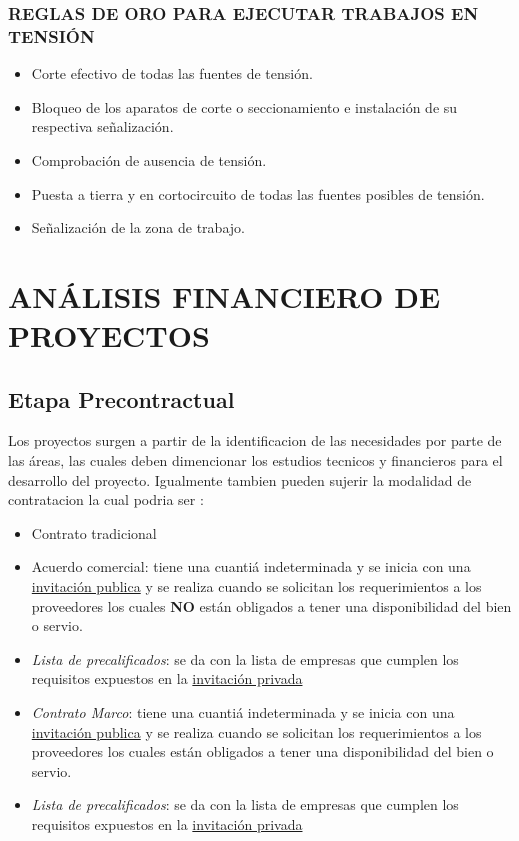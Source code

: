 \documentclass[a5paper]{book}%
\begin{document}
\subsection{REGLAS DE ORO PARA EJECUTAR TRABAJOS EN TENSIÓN}

\begin{itemize}
\item Corte efectivo de todas las fuentes de tensión.
\item Bloqueo de los aparatos de corte o seccionamiento e instalación de su respectiva señalización.
\item Comprobación de ausencia de tensión.
\item Puesta a tierra y en cortocircuito de todas las fuentes posibles de tensión.
\item  Señalización de la zona de trabajo.
\end{itemize}

\chapter{ANÁLISIS FINANCIERO DE PROYECTOS}

\section{Etapa Precontractual}

Los proyectos surgen a partir de la identificacion de las necesidades por parte de las áreas, las cuales deben dimencionar los estudios tecnicos y financieros para el desarrollo del proyecto. Igualmente tambien pueden sujerir la modalidad de contratacion la cual podria ser :

\begin{itemize}
	\item Contrato tradicional 
	\item Acuerdo comercial: tiene  una cuantiá indeterminada y se inicia con una \underline{invitación publica}  y se realiza cuando se solicitan los requerimientos a los proveedores los cuales \textbf{NO} están obligados a tener una disponibilidad del bien o servio.
	\item \textit{Lista de precalificados}: se da con la lista de empresas que cumplen los requisitos expuestos en la \underline{invitación privada}
	\item \textit{Contrato Marco}: tiene  una cuantiá indeterminada y se inicia con una \underline{invitación publica}  y se realiza cuando se solicitan los requerimientos a los proveedores los cuales están obligados a tener una disponibilidad del bien o servio.
	\item \textit{Lista de precalificados}: se da con la lista de empresas que cumplen los requisitos expuestos en la \underline{invitación privada}
\end{itemize}
\end{document}
